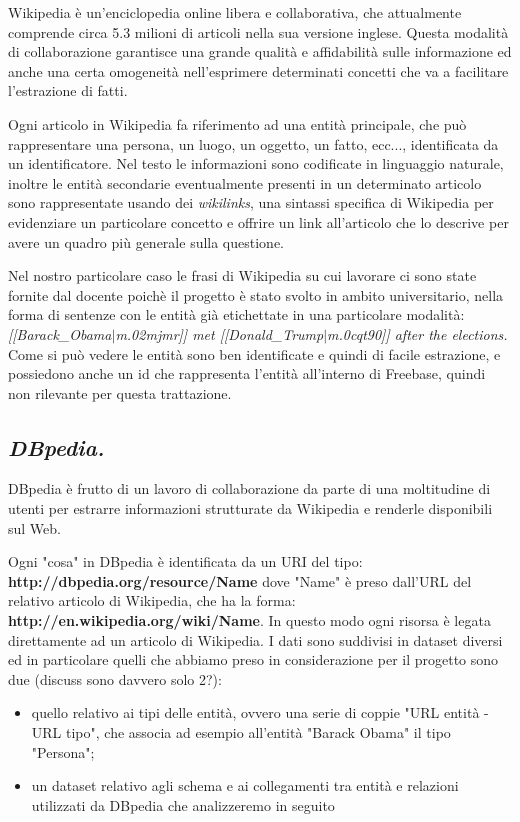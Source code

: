 \documentclass[10pt,a4paper,twocolumn]{article}
\begin{document}
Wikipedia è un'enciclopedia online libera e collaborativa, che attualmente comprende circa 5.3 milioni di articoli nella sua versione inglese. Questa modalità di collaborazione garantisce una grande qualità e affidabilità sulle informazione ed anche una certa omogeneità nell'esprimere determinati concetti che va a facilitare l'estrazione di fatti.
 
Ogni articolo in Wikipedia fa riferimento ad una entità principale, che può rappresentare una persona, un luogo, un oggetto, un fatto, ecc..., identificata da un identificatore. Nel testo le informazioni sono codificate in linguaggio naturale, inoltre le entità secondarie eventualmente presenti in un determinato articolo sono rappresentate usando dei \textit{wikilinks}, una sintassi specifica di Wikipedia per evidenziare un particolare concetto e offrire un link all'articolo che lo descrive per avere un quadro più generale sulla questione.

Nel nostro particolare caso le frasi di Wikipedia su cui lavorare ci sono state fornite dal docente poichè il progetto è stato svolto in ambito universitario, nella forma di sentenze con le entità già etichettate in una particolare modalità:
\bigbreak
\textit{[[Barack\_Obama$|$m.02mjmr]] met [[Donald\_Trump$|$m.0cqt90]] after the elections.}
\bigbreak
Come si può vedere le entità sono ben identificate e quindi di facile estrazione, e possiedono anche un id che rappresenta l'entità all'interno di Freebase, quindi non rilevante per questa trattazione.

\subsection*{\textit{DBpedia.}}

DBpedia è frutto di un lavoro di collaborazione da parte di una moltitudine di utenti per estrarre informazioni strutturate da Wikipedia e renderle disponibili sul Web.

Ogni "cosa" in DBpedia è identificata da un URI del tipo:
\bigbreak
\textbf{http://dbpedia.org/resource/Name}
\bigbreak
dove "Name" è preso dall'URL del relativo articolo di Wikipedia, che ha la forma:
\bigbreak
\textbf{http://en.wikipedia.org/wiki/Name}.
\bigbreak
In questo modo ogni risorsa è legata direttamente ad un articolo di Wikipedia. I dati sono suddivisi in dataset diversi ed in particolare quelli che abbiamo preso in considerazione per il progetto sono due (discuss sono davvero solo 2?):
\begin{itemize}
\item quello relativo ai tipi delle entità, ovvero una serie di coppie "URL entità - URL tipo", che associa ad esempio all'entità "Barack Obama" il tipo "Persona";
\item un dataset relativo agli schema e ai collegamenti tra entità e relazioni utilizzati da DBpedia che analizzeremo in seguito
\end{itemize}
\end{document}
